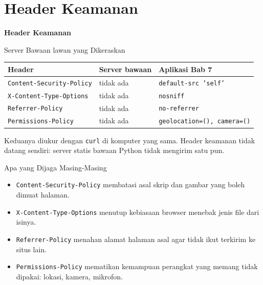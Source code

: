 \documentclass[aspectratio=169, table, 12pt]{beamer}
\begin{document}
\section{Header Keamanan}

\begin{frame}{\hfill}
  \centering
  \Huge{\textbf{Header Keamanan}}
\end{frame}

\begin{frame}{{\Large Server Bawaan lawan yang Dikeraskan}}
  \vspace{6pt}
  \centering
  {\footnotesize
  \begin{tabularx}{\textwidth}{Yll}
    \hline
    \textbf{Header} & \textbf{Server bawaan} & \textbf{Aplikasi Bab 7} \\
    \hline
    \texttt{Content-Security-Policy} & tidak ada & \texttt{default-src 'self'} \\
    \hline
    \texttt{X-Content-Type-Options} & tidak ada & \texttt{nosniff} \\
    \hline
    \texttt{Referrer-Policy} & tidak ada & \texttt{no-referrer} \\
    \hline
    \texttt{Permissions-Policy} & tidak ada & \texttt{geolocation=(), camera=()} \\
    \hline
  \end{tabularx}}

  \vspace{8pt}
  {\small Keduanya diukur dengan \texttt{curl} di komputer yang sama. Header
  keamanan tidak datang sendiri: server statis bawaan Python tidak mengirim
  satu pun.}
\end{frame}

\begin{frame}{{\Large Apa yang Dijaga Masing-Masing}}
  \vspace{12pt}
  \begin{itemize}
    \item \texttt{Content-Security-Policy} membatasi asal skrip dan gambar
          yang boleh dimuat halaman.
    \item \texttt{X-Content-Type-Options} menutup kebiasaan browser menebak
          jenis file dari isinya.
    \item \texttt{Referrer-Policy} menahan alamat halaman asal agar tidak
          ikut terkirim ke situs lain.
    \item \texttt{Permissions-Policy} mematikan kemampuan perangkat yang
          memang tidak dipakai: lokasi, kamera, mikrofon.
  \end{itemize}
\end{frame}
\end{document}
